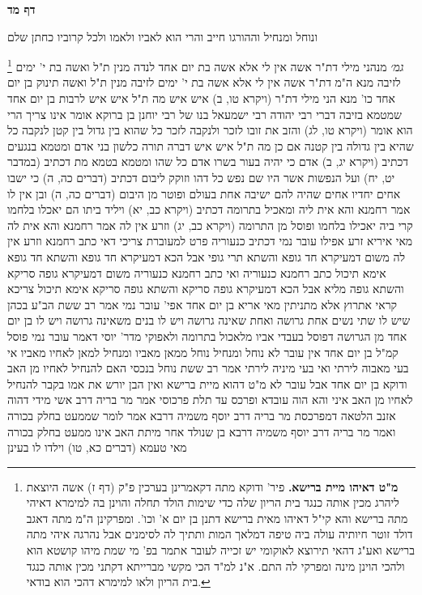 \documentclass[12pt, openany]{book}
\newcommand{\sethebfont}{
\fontsize{10.5pt}{21.0pt} \selectfont
}
\newcommand{\twocol}[1]{
	{\sethebfont \begin{multicols}{2}
			#1
	\end{multicols}}	
}
\newcommand{\sectname}{}
\newcommand{\newsection}[1]{
	\addcontentsline{toc}{section}{#1}
	\renewcommand{\sectname}{#1}	
	\vspace{-\baselineskip}
	\begin{center}
		\textbf{%
\fontsize{16pt}{16pt}\selectfont
			#1}
	\end{center}
	\vspace{-\baselineskip}
	\nopagebreak
}
\newcommand{\footnotecomment}[1]{
	\renewcommand\thefootnote{}
	\footnote{#1}}
\newcommand{\commenta}[1]{\footnotecomment{#1}}
\begin{document}
\newsection{דף מד}
\twocol{ונוחל ומנחיל וההורגו חייב והרי הוא לאביו ולאמו ולכל קרוביו כחתן שלם 
\commenta{\textbf{מ"ט דאיהו מיית ברישא.} פיר' ודוקא מתה דקאמרינן בערכין פ"ק (דף ז) אשה היוצאת ליהרג מכין אותה כנגד בית הריון שלה כדי שימות הולד תחלה והוינן בה למימרא דאיהי מתה ברישא והא קי"ל דאיהו מאית ברישא דתנן בן יום א' וכו'. ומפרקינן ה"מ מתה דאגב דולד זוטר חיותיה עולה ביה טיפה דמלאך המות ותתיך לה לסימנים אבל נהרגה איהי מתה ברישא ואע"ג דהאי תירוצא לאוקומי יש זכייה לעובר אתמר בפ' מי שמת מיהו קושטא הוא ולהכי הוינן מינה ומפרקי לה התם. א"נ למ"ד הכי מקשי מברייתא דקתני מכין אותה כנגד בית הריון ולאו למימרא דהכי הוא בודאי. }
{\large\emph{גמ׳}} מנהני מילי דת"ר אשה אין לי אלא אשה בת יום אחד לנדה מנין ת"ל ואשה
בת י' ימים לזיבה מנא ה"מ דת"ר אשה אין לי אלא אשה בת י' ימים לזיבה מנין ת"ל ואשה
תינוק בן יום אחד כו' מנא הני מילי דת"ר (ויקרא טו, ב) איש איש מה ת"ל איש איש לרבות בן יום אחד שמטמא בזיבה דברי רבי יהודה 
רבי ישמעאל בנו של רבי יוחנן בן ברוקא אומר אינו צריך הרי הוא אומר (ויקרא טו, לג) והזב את זובו לזכר ולנקבה לזכר כל שהוא בין גדול בין קטן לנקבה כל שהיא בין גדולה בין קטנה אם כן מה ת"ל איש איש דברה תורה כלשון בני אדם
ומטמא בנגעים דכתיב (ויקרא יג, ב) אדם כי יהיה בעור בשרו אדם כל שהו
ומטמא בטמא מת דכתיב (במדבר יט, יח) ועל הנפשות אשר היו שם נפש כל דהו
וזוקק ליבום דכתיב (דברים כה, ה) כי ישבו אחים יחדיו אחים שהיה להם ישיבה אחת בעולם
ופוטר מן היבום (דברים כה, ה) ובן אין לו אמר רחמנא והא אית ליה
ומאכיל בתרומה דכתיב (ויקרא כב, יא) ויליד ביתו הם יאכלו בלחמו קרי ביה יאכילו בלחמו
ופוסל מן התרומה (ויקרא כב, יג) וזרע אין לה אמר רחמנא והא אית לה 
מאי איריא זרע אפילו עובר נמי דכתיב כנעוריה פרט למעוברת 
צריכי דאי כתב רחמנא וזרע אין לה משום דמעיקרא חד גופא והשתא תרי גופי אבל הכא דמעיקרא חד גופא והשתא חד גופא אימא תיכול כתב רחמנא כנעוריה 
ואי כתב רחמנא כנעוריה משום דמעיקרא גופה סריקא והשתא גופה מליא אבל הכא דמעיקרא גופה סריקא והשתא גופה סריקא אימא תיכול צריכא 
קראי אתרוץ אלא מתניתין מאי אריא בן יום אחד אפי' עובר נמי אמר רב ששת הב"ע בכהן שיש לו שתי נשים אחת גרושה ואחת שאינה גרושה ויש לו בנים משאינה גרושה ויש לו בן יום אחד מן הגרושה
דפוסל בעבדי אביו מלאכול בתרומה ולאפוקי מדר' יוסי דאמר עובר נמי פוסל קמ"ל בן יום אחד אין עובר לא
נוחל ומנחיל נוחל ממאן מאביו ומנחיל למאן לאחיו מאביו אי בעי מאבוה לירתי ואי בעי מיניה לירתי 
אמר רב ששת נוחל בנכסי האם להנחיל לאחיו מן האב ודוקא בן יום אחד אבל עובר לא מ"ט דהוא מיית ברישא ואין הבן יורש את אמו
בקבר להנחיל לאחיו מן האב 
איני והא הוה עובדא ופרכס עד תלת פרכוסי אמר מר בריה דרב אשי מידי דהוה אזנב הלטאה דמפרכסת 
מר בריה דרב יוסף משמיה דרבא אמר לומר שממעט בחלק בכורה ואמר מר בריה דרב יוסף משמיה דרבא בן שנולד אחר מיתת האב אינו ממעט בחלק בכורה מאי טעמא (דברים כא, טו) וילדו לו בעינן 
}
\end{document}

